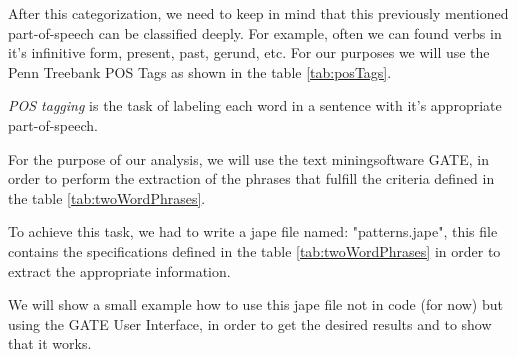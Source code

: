 After this categorization, we need to keep in mind that this previously mentioned part-of-speech can be classified deeply. For example, often we can found verbs in it's infinitive form, present, past, gerund, etc. For our purposes we will use the Penn Treebank POS Tags as shown in the table \ref{tab:posTags}.

\emph{POS tagging} is the task of labeling each word in a sentence with it's appropriate part-of-speech.

For the purpose of our analysis, we will use the \gls{text mining}software GATE, in order to perform the extraction of the phrases that fulfill the criteria defined in the table \ref{tab:twoWordPhrases}.

To achieve this task, we had to write a jape file named: "patterns.jape", this file contains the specifications defined in the table \ref{tab:twoWordPhrases} in order to extract the appropriate information.

We will show a small example how to use this jape file not in code (for now) but using the GATE User Interface, in order to get the desired results and to show that it works.


